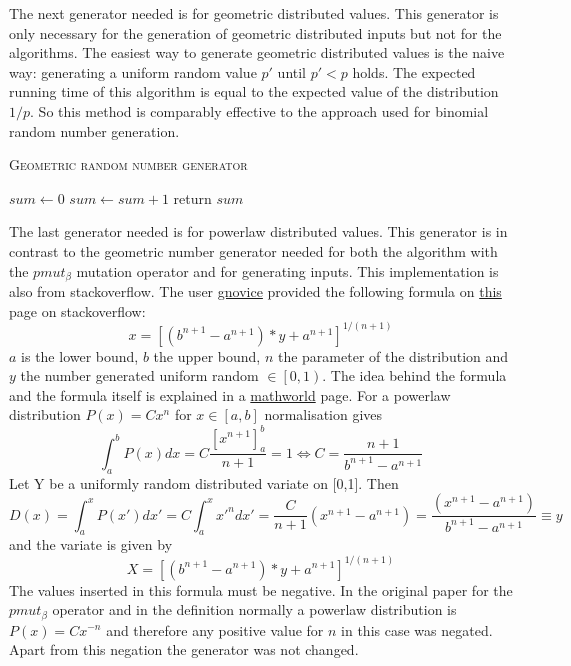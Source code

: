 The next generator needed is for geometric distributed values.
This generator is only necessary for the generation of geometric distributed inputs but not for the algorithms.
The easiest way to generate geometric distributed values is the naive way:
generating a uniform random value $p'$ until $p'<p$ holds.
The expected running time of this algorithm is equal to the expected value of the distribution $1/p$.
So this method is comparably effective to the approach used for binomial random number generation.

\begin{algorithm}[h]
      \caption{\textsc{Geometric random number generator}}\label{alg:geometricRNG}

      \DontPrintSemicolon %
      $sum \leftarrow 0$\; \tcp{random() generates a random value $\in \left[0, 1\right)$}
      {
            $sum \leftarrow sum+1$\;
      }
      return $sum$\;
\end{algorithm}

The last generator needed is for powerlaw distributed values.
This generator is in contrast to the geometric number generator needed for both the algorithm with the $pmut_\beta$ mutation operator and for generating inputs.
This implementation is also from stackoverflow. The user \href{https://stackoverflow.com/users/52738/gnovice}{gnovice} provided the following formula on \href{https://stackoverflow.com/questions/918736/random-number-generator-that-produces-a-power-law-distribution}{this} page on stackoverflow:
\[
      x = {[(b^{n+1} - a^{n+1})*y + a^{n+1}]}^{1/(n+1)}
\]
$a$ is the lower bound, $b$ the upper bound, $n$ the parameter of the distribution and $y$ the number generated uniform random $\in \left[0, 1\right)$.
The idea behind the formula and the formula itself is explained in a \href{https://mathworld.wolfram.com/RandomNumber.html}{mathworld} page.
For a powerlaw distribution \(P(x)=Cx^n\) for \(x\in[a,b]\) normalisation gives
\[\int_{a}^{b}{P(x)dx}=C\frac{{[x^{n+1}]}^{b}_{a}}{n+1}=1\Leftrightarrow C = \frac{n+1}{b^{n+1}-a^{n+1}}\]
Let Y be a uniformly random distributed variate on [0,1]. Then
\[D(x)=\int_{a}^{x}{P(x')dx'}=C\int_{a}^{x}{{x'}^{n}dx'}=\frac{C}{n+1}(x^{n+1}-a^{n+1})=\frac{(x^{n+1}-a^{n+1})}{b^{n+1}-a^{n+1}}\equiv y\]
and the variate is given by
\[X={[(b^{n+1} - a^{n+1})*y + a^{n+1}]}^{1/(n+1)}\]
The values inserted in this formula must be negative.
In the original paper for the $pmut_{\beta}$ operator and in the definition normally a powerlaw distribution is \(P(x)=Cx^{-n}\) and therefore any positive value for $n$ in this case was negated.
Apart from this negation the generator was not changed.

